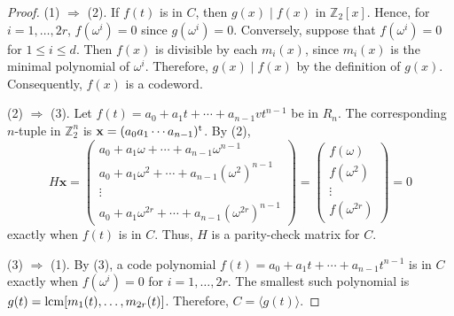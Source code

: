\begin{proof}
(1) $\Rightarrow$ (2).
If $f(t)$ is in $C$, then $g(x) \mid f(x)$ in ${\mathbb Z}_2[x]$. Hence,
for $i = 1, \ldots, 2r$, $f( \omega^i) = 0$ since $g( \omega^i ) =
0$. Conversely, suppose that $f( \omega^i) = 0$ for $1 \leq i \leq d$.
Then $f(x)$ is divisible by each $m_i(x)$, since $m_i(x)$ is the
minimal polynomial of $\omega^i$. Therefore, $g(x) \mid f(x)$ by the
definition of $g(x)$. Consequently, $f(x)$ is a codeword.


(2) $\Rightarrow$ (3).
Let \mbox{$f(t) = a_0 + a_1 t + \cdots + a_{n-1}v t^{n-1}$} be in $R_n$. The
corresponding $n$-tuple in ${\mathbb Z}_2^n$ is ${\mathbf x} = (a_0 a_1
\cdots a_{n-1})^{\rm t}$. By (2),
\[
H {\mathbf x}
=
\begin{pmatrix}
a_0 + a_1 \omega + \cdots + a_{n-1} \omega^{n-1} \\
a_0 + a_1 \omega^2 + \cdots + a_{n-1} (\omega^2)^{n-1} \\
\vdots \\
a_0 + a_1 \omega^{2r} + \cdots + a_{n-1} (\omega^{2r})^{n-1}
\end{pmatrix}
=
\begin{pmatrix}
f(\omega) \\
f(\omega^2) \\
\vdots \\
f(\omega^{2r})
\end{pmatrix}
=0
\]
exactly when $f(t)$ is in $C$. Thus, $H$ is a parity-check matrix for
$C$.

(3) $\Rightarrow$ (1).
By (3), a code polynomial $f(t) = a_0 + a_1 t + \cdots + a_{n-1}
t^{n-1}$ is in $C$ exactly when $f(\omega^i) = 0$ for $i = 1, \ldots,
2r$. The smallest such polynomial is $g(t) = \operatorname{lcm}[ m_1(t),\ldots,
m_{2r}(t)]$.  Therefore, $C = \langle g(t) \rangle$.
\end{proof}



